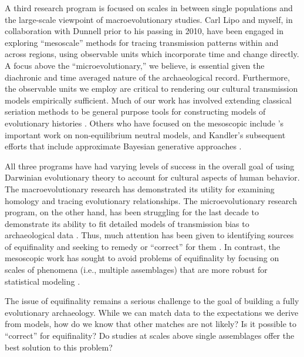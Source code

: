 A third research program is focused on scales in between single populations and the large-scale viewpoint of macroevolutionary studies.  Carl Lipo and myself, in collaboration with Dunnell prior to his passing in 2010, have been engaged in exploring ``mesoscale'' methods for tracing transmission patterns within and across regions, using observable units which incorporate time and change directly.  A focus above the ``microevolutionary,'' we believe, is essential given the diachronic and time averaged nature of the archaeological record.  Furthermore, the observable units we employ are critical to rendering our cultural transmission models empirically sufficient. Much of our work has involved extending classical seriation methods to be general purpose tools for constructing models of evolutionary histories \citep{Lipo1997,Lipo2001,Lipo2001neutrality,Lipo2005,Lipo2015,lipomadsen1997,lipomadsenhunt1995b,Madsen2008,Madsen2014,madsenlipo2015b}.  Others who have focused on the mesoscopic include \citet*{Kandler2013}'s important work on non-equilibrium neutral models, and Kandler's subsequent efforts that include approximate Bayesian generative approaches \citep{Kandler20150905,kandler2018generative,wilderkandler2015}.  

All three programs have had varying levels of success in the overall goal of using Darwinian evolutionary theory to account for cultural aspects of human behavior. The macroevolutionary research has demonstrated its utility for examining homology and tracing evolutionary relationships. The microevolutionary research program, on the other hand, has been struggling for the last decade to demonstrate its ability to fit detailed models of transmission bias to archaeological data \citep{kandler2019analysing}. Thus, much attention has been given to identifying sources of equifinality and seeking to remedy or “correct” for them \citep{barrett2019equifinality,premo2010equifinality}. In contrast, the mesoscopic work has sought to avoid problems of equifinality by focusing on scales of phenomena (i.e., multiple assemblages) that are more robust for statistical modeling . 

The issue of equifinality remains a serious challenge to the goal of building a fully evolutionary archaeology.  While we can match data to the expectations we derive from models, how do we know that other matches are not likely?  Is it possible to ``correct'' for equifinality?  Do studies at scales above single assemblages offer the best solution to this problem?  

